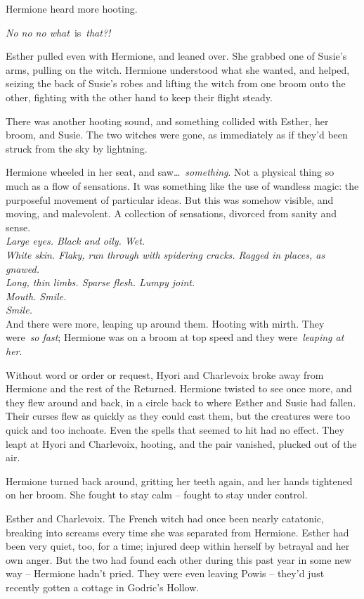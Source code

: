 Hermione heard more hooting.

\emph{No no no what}~is~\emph{that?!}

Esther pulled even with Hermione, and leaned over. She grabbed one of
Susie's arms, pulling on the witch. Hermione understood what she wanted,
and helped, seizing the back of Susie's robes and lifting the witch from
one broom onto the other, fighting with the other hand to keep their
flight steady.

There was another hooting sound, and something collided with Esther, her
broom, and Susie. The two witches were gone, as immediately as if they'd
been struck from the sky by lightning.

Hermione wheeled in her seat, and saw\ldots~\emph{something}. Not a
physical thing so much as a flow of sensations. It was something like
the use of wandless magic: the purposeful movement of particular ideas.
But this was somehow visible, and moving, and malevolent. A collection
of sensations, divorced from sanity and sense.\\

\emph{Large eyes. Black and oily. Wet.}\\
\emph{White skin. Flaky, run through with spidering cracks. Ragged in
places, as gnawed.}\\
\emph{Long, thin limbs. Sparse flesh. Lumpy joint.}\\
\emph{Mouth. Smile.}\\
\emph{Smile.}\\

And there were more, leaping up around them. Hooting with mirth. They
were~\emph{so fast}; Hermione was on a broom at top speed and they
were~\emph{leaping at her}.

Without word or order or request, Hyori and Charlevoix broke away from
Hermione and the rest of the Returned. Hermione twisted to see once
more, and they flew around and back, in a circle back to where Esther
and Susie had fallen. Their curses flew as quickly as they could cast
them, but the creatures were too quick and too inchoate. Even the spells
that seemed to hit had no effect. They leapt at Hyori and Charlevoix,
hooting, and the pair vanished, plucked out of the air.

Hermione turned back around, gritting her teeth again, and her hands
tightened on her broom. She fought to stay calm -- fought to stay under
control.

Esther and Charlevoix. The French witch had once been nearly catatonic,
breaking into screams every time she was separated from Hermione. Esther
had been very quiet, too, for a time; injured deep within herself by
betrayal and her own anger. But the two had found each other during this
past year in some new way -- Hermione hadn't pried. They were even
leaving Powis -- they'd just recently gotten a cottage in Godric's
Hollow.

